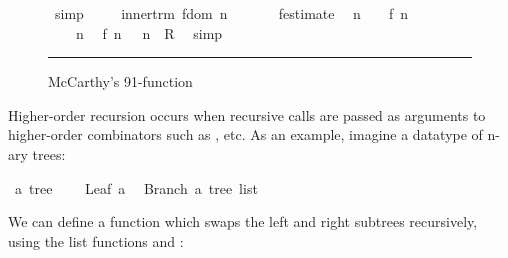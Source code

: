 \begin{isabellebody}
\begin{figure}
\begin{minipage}{0.8\textwidth}
\ simp\ %
\isanewline
\isanewline
\ \ \isamarkupfalse%
\ inner{\isacharunderscore}trm{\isacharcolon}\ {\isachardoublequoteopen}f{}{}{\isacharunderscore}dom\ {\isacharparenleft}n\ {\isacharplus}\ {}{}{\isacharparenright}{\isachardoublequoteclose}\ %
\isanewline
\ \ \isamarkupfalse%
\ f{}{}{\isacharunderscore}estimate\ \isamarkupfalse%
\ {\isachardoublequoteopen}n\ {\isacharplus}\ {}{}\ {\isacharless}\ f{}{}\ {\isacharparenleft}n\ {\isacharplus}\ {}{}{\isacharparenright}\ {\isacharplus}\ {}{}{\isachardoublequoteclose}\ \isacommand{{\isachardot}}\isamarkupfalse%
\isanewline
\ \ \isamarkupfalse%
\ {\isacharbackquoteopen}{\isasymnot}\ {}{}{}\ {\isacharless}\ n{\isacharbackquoteclose}\ \isamarkupfalse%
\ {\isachardoublequoteopen}{\isacharparenleft}f{}{}\ {\isacharparenleft}n\ {\isacharplus}\ {}{}{\isacharparenright}{\isacharcomma}\ n{\isacharparenright}\ {\isasymin}\ {\isacharquery}R{\isachardoublequoteclose}\ \isamarkupfalse%
\ simp\isanewline
{}\isamarkupfalse%
%
\endisatagproof
{\isafoldproof}%
%
\isadelimproof
%
\endisadelimproof
%
\isamarkupfalse{}
\end{minipage}
\vspace{6pt}\hrule
\caption{McCarthy's 91-function}\label{f91}
\end{figure}
%
\isamarkuptrue%
%
\begin{isamarkuptext}%
Higher-order recursion occurs when recursive calls
  are passed as arguments to higher-order combinators such as ,  etc.
  As an example, imagine a datatype of n-ary trees:%
\end{isamarkuptext}%
\isamarkuptrue%
\isamarkupfalse%
\ {\isacharprime}a\ tree\ {\isacharequal}\ \isanewline
\ \ Leaf\ {\isacharprime}a\ \isanewline
{\isacharbar}\ Branch\ {\isachardoublequoteopen}{\isacharprime}a\ tree\ list{\isachardoublequoteclose}%
\begin{isamarkuptext}%
\noindent We can define a function which swaps the left and right subtrees recursively, using the 
  list functions  and :%
\end{isamarkuptext}%

\end{isabellebody}
